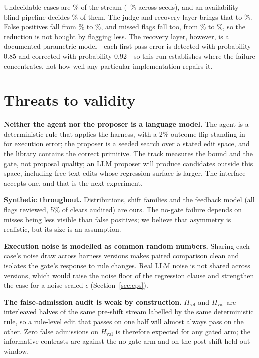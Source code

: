 \documentclass[11pt]{article}
\newcommand{\Hsel}{H_{\mathrm{sel}}}
\newcommand{\Hval}{H_{\mathrm{val}}}
\begin{document}
Undecidable cases are \% of the stream (--\% across seeds), and an availability-blind pipeline decides \% of them. The judge-and-recovery layer brings that to \%. False positives fall from \% to \%, and missed flags fall too, from \% to \%, so the reduction is not bought by flagging less. The recovery layer, however, is a documented parametric model---each first-pass error is detected with probability 0.85 and corrected with probability 0.92---so this run establishes where the failure concentrates, not how well any particular implementation repairs it.

\section{Threats to validity}
\label{sec:threats}

\textbf{Neither the agent nor the proposer is a language model.} The agent is a deterministic rule that applies the harness, with a 2\% outcome flip standing in for execution error; the proposer is a seeded search over a stated edit space, and the library contains the correct primitive. The track measures the bound and the gate, not proposal quality; an LLM proposer will produce candidates outside this space, including free-text edits whose regression surface is larger. The interface accepts one, and that is the next experiment.

\textbf{Synthetic throughout.} Distributions, shift families and the feedback model (all flags reviewed, 5\% of clears audited) are ours. The no-gate failure depends on misses being less visible than false positives; we believe that asymmetry is realistic, but its size is an assumption.

\textbf{Execution noise is modelled as common random numbers.} Sharing each case's noise draw across harness versions makes paired comparison clean and isolates the gate's response to rule changes. Real LLM noise is not shared across versions, which would raise the noise floor of the regression clause and strengthen the case for a noise-scaled $\epsilon$ (Section~\ref{sec:eps}).

\textbf{The false-admission audit is weak by construction.} $\Hsel$ and $\Hval$ are interleaved halves of the same pre-shift stream labelled by the same deterministic rule, so a rule-level edit that passes on one half will almost always pass on the other. Zero false admissions on $\Hval$ is therefore expected for any gated arm; the informative contrasts are against the no-gate arm and on the post-shift held-out window.
\end{document}
